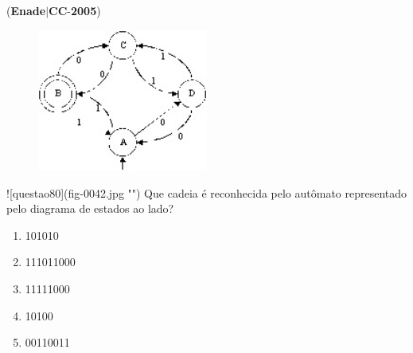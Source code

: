 \documentclass{exam}
\begin{document}
\begin{questions}
\begin{enumerate}[label=\alph*)]
	\end{enumerate}

\question (\textbf{Enade}$|$\textbf{CC}-\textbf{2005}) \begin{figure}[H]
	\begin{center}
		\includegraphics[width=0.5\textwidth]{CIENCIA_DA_COMPUTACAO_Prova2005-utf8_figuras/fig-0042.jpg}
		\caption{}
	\end{center}
\end{figure}
![questao80](fig-0042.jpg "")
Que cadeia é reconhecida pelo
autômato representado pelo
diagrama de estados ao lado?
	\begin{enumerate}[label=\alph*)]
		\item  101010
		\item  111011000
		\item  11111000
		\item  10100
		\item  00110011

	\end{enumerate}


\end{questions}
\end{document}

